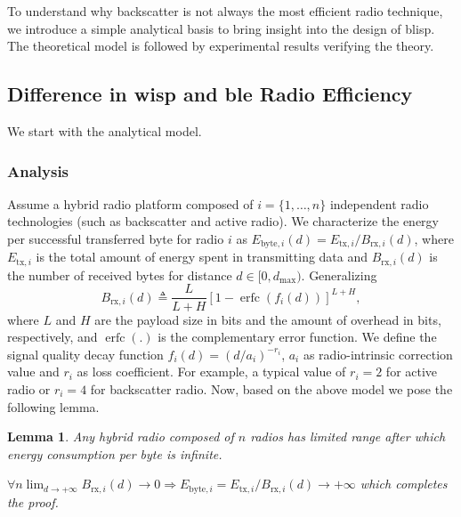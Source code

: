 \documentclass[conference,letterpaper,twoside,final,10pt]{IEEEtran}
\DeclareMathOperator\erfc{erfc}
\newtheorem{lemma}{Lemma}
\begin{document}
To understand why backscatter is not always the most efficient radio technique, we introduce a simple analytical basis to bring insight into the design of \ac{blisp}. The theoretical model is followed by experimental results verifying the theory.

\subsection{Difference in \acs{wisp} and \acs{ble} Radio Efficiency}
\label{sec:motivation/efficiency}

We start with the analytical model.

\subsubsection{Analysis}
\label{sec:motivation/evaluation}

Assume a hybrid radio platform composed of $i=\{1,\ldots,n\}$ independent radio technologies (such as backscatter and active radio). We characterize the energy per successful transferred byte for radio $i$ as $E_{\text{byte},i}(d) = E_{\text{tx},i} / B_{\text{rx},i}(d)$, where $E_{\text{tx},i}$ is the total amount of energy spent in transmitting data and $B_{\text{rx},i}(d)$ is the number of received bytes for distance $d \in [0, d_{\max})$. Generalizing~\cite[Sec. III-A]{lettieri1998info}
\begin{equation}
	B_{\text{rx},i}(d) \triangleq \frac{L}{L+H} \left[ 1 - \erfc\left( f_{i}(d) \right) \right] ^ {L+H},
	\label{eq:rx_bytes}
\end{equation}
where $L$ and $H$ are the payload size in bits and the amount of overhead in bits, respectively, and $\erfc(.)$ is the complementary error function.
We define the signal quality decay function $f_{i}(d) = \left( d / a_{i} \right) ^ {-r_{i}}$, $a_{i}$ as radio-intrinsic correction value and $r_{i}$ as loss coefficient. For example, a typical value of $r_{i}=2$ for active radio or $r_{i}=4$ for backscatter radio. Now, based on the above model we pose the following lemma.
\begin{lemma}
	\label{lemma:gotoinfinity}
	Any hybrid radio composed of $n$ radios has limited range after which energy consumption per byte is infinite.
	\begin{IEEEproof} $\forall n \lim_{d \to +\infty} B_{\text{rx},i}(d) \to 0 \Rightarrow E_{\text{byte},i} = { E_{\text{tx},i} }/{ B_{\text{rx},i}(d) } \to +\infty$ which completes the proof.
	\end{IEEEproof}
\end{lemma}
\end{document}
